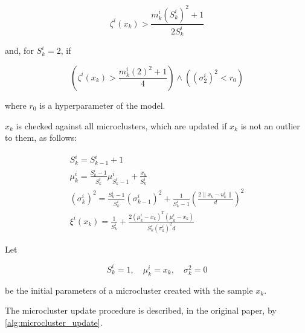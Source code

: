\documentclass[a4paper]{article}
\begin{document}
\begin{equation}
    \zeta^i(x_k) > \frac{m^i_k(S^i_k)^2 + 1}{2S^i_k} \label{eq:outlier_condition}
\end{equation}

and, for $S^i_k = 2$, if

\begin{equation}
    \left( \zeta^i(x_k) > \frac{m^i_k(2)^2 + 1}{4} \right) \land \left( \left( \sigma^i_2 \right)^2 < r_0 \right) \label{critique:incorrect_condition_logic}
\end{equation}

where $r_0$ is a hyperparameter of the model.

$x_k$ is checked against all microclusters, which are updated if $x_k$ is not an outlier to them, as follows:

\begin{equation}
\begin{gathered}
    S^i_k = S^i_{k-1} + 1 \\
    \mu^i_k = \frac{S^i_k - 1}{S^i_k} \mu^i_{S^i_{k}-1} + \frac{x_k}{S^i_k} \\
    \left(\sigma^i_k\right)^2 = \frac{S^i_k - 1}{S^i_k} \left(\sigma^i_{k-1}\right)^2 + \frac{1}{S^i_k - 1} \left( \frac{2\lVert x_k - u^i_k \rVert }{d} \right)^2 \\
    \xi^i(x_k) = \frac{1}{S^i_k} + \frac{2\left( \mu^i_k - x_k \right)^T \left( \mu^i_k - x_k \right)}{S^i_k \left( \sigma^i_k \right)^2d}
\end{gathered} \label{critique:dimensionality_penalty}
\end{equation}

Let

\begin{equation}
    S^i_k = 1, \quad \mu^i_k = x_k, \quad \sigma^2_k = 0 \label{eq:initial_microcluster_parameters}
\end{equation}

be the initial parameters of a microcluster created with the sample $x_k$.

The microcluster update procedure is described, in the original paper, by \cref{alg:microcluster_update}.
\end{document}
